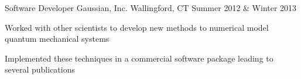 


\begin{cventries}


\cventry
{Software Developer} %
{Gaussian, Inc.} %
{Wallingford, CT} %
{Summer 2012 \& Winter 2013} %
{ %
\begin{cvitems}
\item {Worked with other scientists to develop new methods to numerical model quantum mechanical systems}
\item{Implemented these techniques in a commercial software package leading to several publications}
\end{cvitems}
}



\end{cventries}